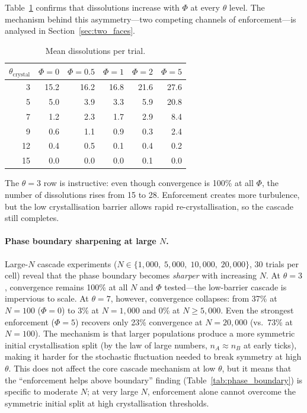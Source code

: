 \documentclass[11pt,a4paper]{article}
\begin{document}
\noindent Table~\ref{tab:phase_dissolutions} confirms that dissolutions increase with $\Phi$ at every $\theta$ level. The mechanism behind this asymmetry---two competing channels of enforcement---is analysed in Section~\ref{sec:two_faces}.

\begin{table}[H]
\centering
\caption{Mean dissolutions per trial.}
\label{tab:phase_dissolutions}
\begin{tabular}{@{}r rrrrr@{}}
\toprule
$\theta_{\mathrm{crystal}}$ & $\Phi{=}0$ & $\Phi{=}0.5$ & $\Phi{=}1$ & $\Phi{=}2$ & $\Phi{=}5$ \\
\midrule
3  & 15.2 & 16.2 & 16.8 & 21.6 & 27.6 \\
5  & 5.0  & 3.9  & 3.3  & 5.9  & 20.8 \\
7  & 1.2  & 2.3  & 1.7  & 2.9  & 8.4 \\
9  & 0.6  & 1.1  & 0.9  & 0.3  & 2.4 \\
12 & 0.4  & 0.5  & 0.1  & 0.4  & 0.2 \\
15 & 0.0  & 0.0  & 0.0  & 0.1  & 0.0 \\
\bottomrule
\end{tabular}
\end{table}

The $\theta = 3$ row is instructive: even though convergence is 100\% at all $\Phi$, the number of dissolutions rises from 15 to 28. Enforcement creates more turbulence, but the low crystallisation barrier allows rapid re-crystallisation, so the cascade still completes.

\paragraph{Phase boundary sharpening at large $N$.} Large-$N$ cascade experiments ($N \in \{1{,}000,\; 5{,}000,\; 10{,}000,\; 20{,}000\}$, 30 trials per cell) reveal that the phase boundary becomes \emph{sharper} with increasing $N$. At $\theta = 3$, convergence remains 100\% at all $N$ and $\Phi$ tested---the low-barrier cascade is impervious to scale. At $\theta = 7$, however, convergence collapses: from 37\% at $N{=}100$ ($\Phi{=}0$) to 3\% at $N{=}1{,}000$ and 0\% at $N \geq 5{,}000$. Even the strongest enforcement ($\Phi = 5$) recovers only 23\% convergence at $N{=}20{,}000$ (vs.\ 73\% at $N{=}100$). The mechanism is that larger populations produce a more symmetric initial crystallisation split (by the law of large numbers, $n_A \approx n_B$ at early ticks), making it harder for the stochastic fluctuation needed to break symmetry at high $\theta$. This does not affect the core cascade mechanism at low $\theta$, but it means that the ``enforcement helps above boundary'' finding (Table~\ref{tab:phase_boundary}) is specific to moderate $N$; at very large $N$, enforcement alone cannot overcome the symmetric initial split at high crystallisation thresholds.
\end{document}
